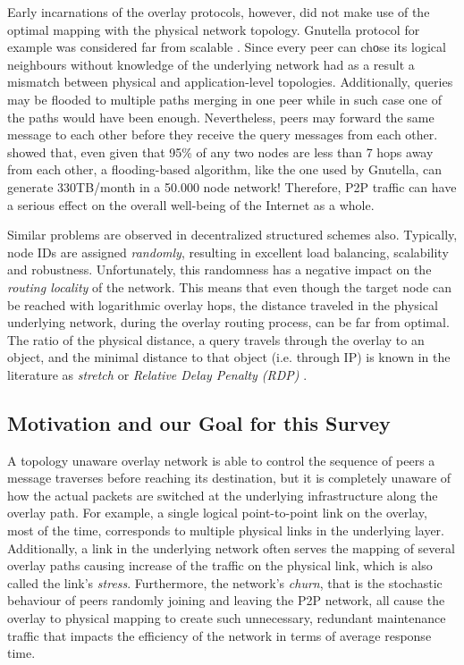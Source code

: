 \documentclass[acmcsur,acmnow]{acmtrans2m}
\begin{document}
Early incarnations of the overlay protocols, however, did not make use of the optimal mapping with the physical network topology. Gnutella protocol for example was considered far from scalable \cite{ritter_gnucantscale_2001}. Since every peer can chοse its logical neighbours without knowledge of the underlying network had as a result a mismatch between physical and application-level topologies. Additionally, queries may be flooded to multiple paths merging in one peer while
in such case one of the paths would have been enough. Nevertheless, peers may forward the same message to each other before they receive the query messages from each other. \cite{matei_mapgnutella_2002} showed that, even given that 95\% of any two nodes are less than 7 hops away from each other, a flooding-based algorithm, like the one used by Gnutella, can generate 330TB/month in a 50.000 node network! Therefore, P2P traffic can have a serious effect on the overall well-being of the Internet as a whole.

Similar problems are observed in decentralized structured schemes also. Typically, node IDs are assigned \emph{randomly}, resulting in excellent load balancing, scalability and robustness. Unfortunately, this randomness has a negative impact on the \emph{routing locality} of the network. This means that
even though the target node can be reached with logarithmic overlay hops, the distance traveled in the physical underlying network, during the overlay routing
process, can be far from optimal.  The ratio of the physical distance, a query travels through the overlay to an object, and the minimal distance to that object (i.e. through IP) is known in the literature as \emph{stretch} or \emph{Relative Delay Penalty (RDP)} \cite{chu_esm_2000}.

\subsection{Motivation and our Goal for this Survey}
A topology unaware overlay network is able to control the sequence of peers a message traverses before reaching its destination, but it is completely unaware of how the actual packets are switched at the underlying infrastructure along the overlay path. For example, a single logical point-to-point link on the overlay, most of the time, corresponds to multiple physical links in the underlying layer. Additionally, a link in the underlying network often serves the mapping of several overlay paths causing increase of the traffic on the physical link, which is also called the link's \emph{stress}\cite{chu_esm_2002}. Furthermore, the network's \emph{churn}, that is the stochastic behaviour of peers randomly joining and leaving the P2P network, all cause the overlay to physical mapping to create such unnecessary, redundant maintenance traffic that impacts the efficiency of the network in terms of average response time.
\end{document}
